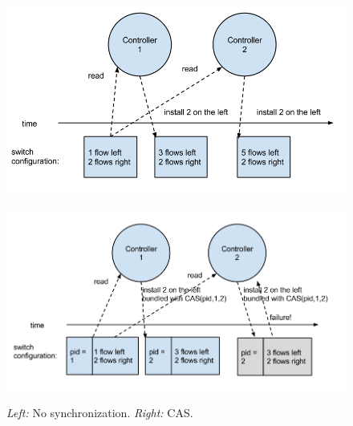 \documentclass[conference]{sigcomm-alternate}
\begin{document}
\begin{figure}[t]
\centering
\includegraphics[width=1\columnwidth]{no-sync.png}~\includegraphics[width=1\columnwidth]{sync-with-cas.png}\\
\caption{\emph{Left:} No synchronization. \emph{Right:}
  CAS.}\label{fig:CAS-example}
\end{figure}


%
\end{document}
